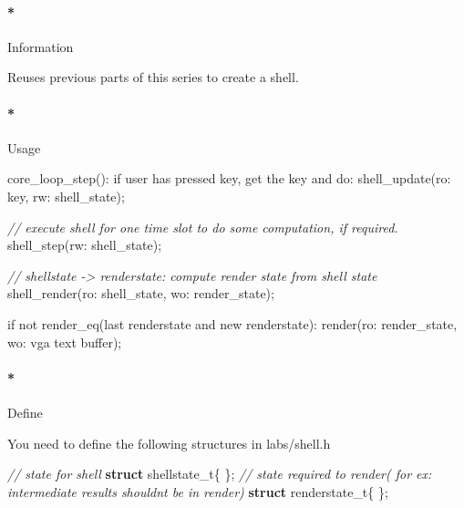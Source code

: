 \documentclass[]{article}
\newenvironment{Shaded}{}{}
\newcommand{\KeywordTok}[1]{\textbf{{#1}}}
\newcommand{\CommentTok}[1]{\textcolor[rgb]{0.50,0.50,0.50}{\textit{{#1}}}}
\newcommand{\ControlFlowTok}[1]{{#1}}
\newcommand{\NormalTok}[1]{{#1}}
\let\oldparagraph\paragraph
\renewcommand{\paragraph}[1]{\oldparagraph{#1}\mbox{}}
\begin{document}
\paragraph*{Information}\label{information-3}

Reuses previous parts of this series to create a shell.

\paragraph*{Usage}\label{usage-3}

\begin{Shaded}
\begin{Highlighting}[]
   \NormalTok{core_loop_step():}
       \ControlFlowTok{if} \NormalTok{user has pressed key, get the key and }\ControlFlowTok{do}\NormalTok{:}
           \NormalTok{shell_update(ro: key, rw: shell_state);}

       \CommentTok{// execute shell for one time slot to do some computation, if required.}
       \NormalTok{shell_step(rw: shell_state);}

       \CommentTok{// shellstate -> renderstate: compute render state from shell state}
       \NormalTok{shell_render(ro: shell_state, wo: render_state);}

       \ControlFlowTok{if} \NormalTok{not render_eq(last renderstate and new renderstate):}
           \NormalTok{render(ro: render_state, wo: vga text buffer);}
\end{Highlighting}
\end{Shaded}

\paragraph*{Define}\label{define-3}

You need to define the following structures in labs/shell.h

\begin{Shaded}
\begin{Highlighting}[]
    \CommentTok{// state for shell}
    \KeywordTok{struct} \NormalTok{shellstate_t\{}
    \NormalTok{\};}
    \CommentTok{// state required to render( for ex: intermediate results shouldnt be in render)}
    \KeywordTok{struct} \NormalTok{renderstate_t\{}
    \NormalTok{\};}
\end{Highlighting}
\end{Shaded}
\end{document}
